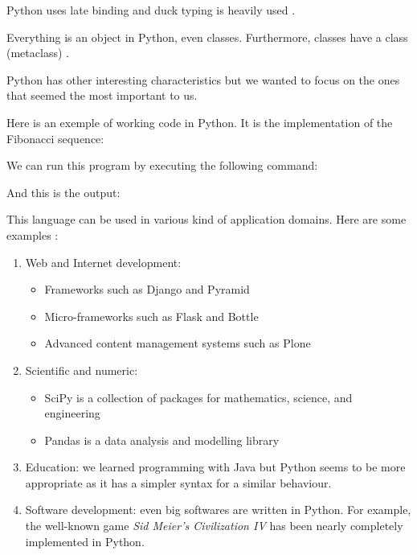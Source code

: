 Python uses late binding \cite{python_pep0289} and duck typing is heavily used \cite{wikipediaEN_duck_typing_python}.

Everything is an object in Python, even classes. Furthermore, classes have a class (metaclass) \cite{python_doc_datamodel}.

Python has other interesting characteristics but we wanted to focus on the ones that seemed the most important to us.
\newline

Here is an exemple of working code in Python. It is the implementation of the Fibonacci sequence:


We can run this program by executing the following command:


And this is the output:


This language can be used in various kind of application domains. Here are some examples \cite{python_applications}:
\begin{enumerate}
    \item {Web and Internet development:
        \begin{itemize}
            \item Frameworks such as Django and Pyramid
            \item Micro-frameworks such as Flask and Bottle
            \item Advanced content management systems such as Plone
        \end{itemize}
    }
    \item {Scientific and numeric:
        \begin{itemize}
            \item SciPy is a collection of packages for mathematics, science, and engineering
            \item Pandas is a data analysis and modelling library
        \end{itemize}
    
    }
    \item Education: we learned programming with Java but Python seems to be more appropriate as it has a simpler syntax for a similar behaviour.
    \item Software development: even big softwares are written in Python. For example, the well-known game \emph{Sid Meier's Civilization IV} has been nearly completely implemented in Python.
\end{enumerate}
